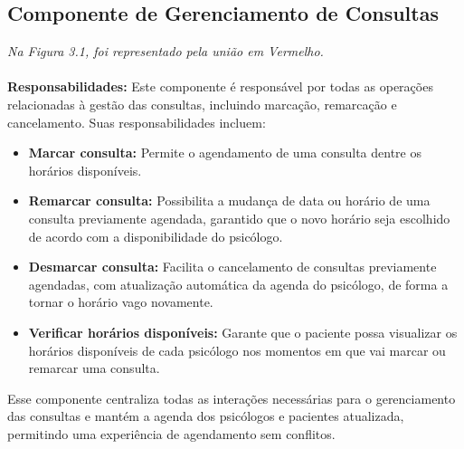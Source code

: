 \documentclass[a4paper,12pt]{report}
\begin{document}
\subsection{Componente de Gerenciamento de Consultas}
\textit{Na Figura 3.1, foi representado pela união em Vermelho.} \\ 
\\
\textbf{Responsabilidades:} 
Este componente é responsável por todas as operações relacionadas à gestão das consultas, incluindo marcação, remarcação e cancelamento. Suas responsabilidades incluem:
\begin{itemize}
    \item \textbf{Marcar consulta:} Permite o agendamento de uma consulta dentre os horários disponíveis.
    \item \textbf{Remarcar consulta:} Possibilita a mudança de data ou horário de uma consulta previamente agendada, garantido que o novo horário seja escolhido de acordo com a disponibilidade do psicólogo.
    \item \textbf{Desmarcar consulta:} Facilita o cancelamento de consultas previamente agendadas, com atualização automática da agenda do psicólogo, de forma a tornar o horário vago novamente.
    \item \textbf{Verificar horários disponíveis:} Garante que o paciente possa visualizar os horários disponíveis de cada psicólogo nos momentos em que vai marcar ou remarcar uma consulta. 
\end{itemize}

Esse componente centraliza todas as interações necessárias para o gerenciamento das consultas e mantém a agenda dos psicólogos e pacientes atualizada, permitindo uma experiência de agendamento sem conflitos.
\end{document}
